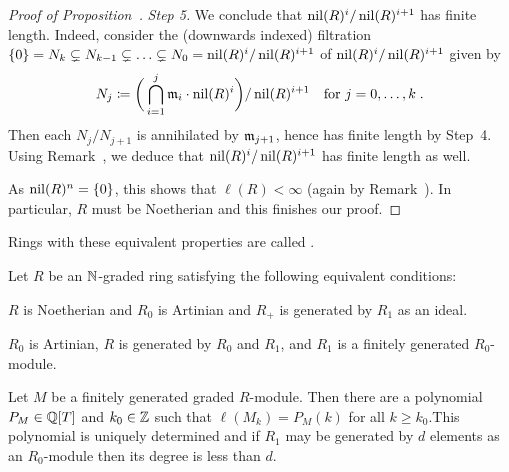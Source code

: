 \documentclass[a4paper,parskip=half,numbers=enddot, DIV=12]{scrreprt}
\begin{document}
\begin{proof}[Proof of Proposition~]
    \emph{Step 5.} We conclude that $\operatorname{nil}(R)^i/\operatorname{nil}(R)^{i+1}$ has finite length. Indeed, consider the (downwards indexed) filtration $\{0\}=N_k\subsetneq N_{k-1}\subsetneq \ldots\subsetneq N_0=\operatorname{nil}(R)^i/\operatorname{nil}(R)^{i+1}$ of $\operatorname{nil}(R)^i/\operatorname{nil}(R)^{i+1}$ given by
    \begin{align*}
        N_j\coloneqq\bigg(\bigcap_{i=1}^j\mathfrak{m}_i\cdot\operatorname{nil}(R)^i\bigg) /\operatorname{nil}(R)^{i+1}\quad\text{for }j=0,\ldots,k\;.
    \end{align*}
    Then each $N_j/N_{j+1}$  is annihilated by $\mathfrak{m}_{j+1}$, hence has finite length by Step~4.  Using Remark~, we deduce that $\operatorname{nil}(R)^i/\operatorname{nil}(R)^{i+1}$ has finite length as well.
    
    As $\operatorname{nil}(R)^n=\{0\}$, this shows that $\ell(R) <\infty$ (again by Remark~). In particular, $R$ must be Noetherian and this finishes our proof.
\end{proof}

\begin{defi}[Artinian]
    Rings with these equivalent properties are called .
\end{defi}
\begin{thm}
    Let $R$ be an $\mathbb{N}$-graded ring satisfying the following equivalent conditions:
    \begin{alphanumerate}
    \item 
        $R$ is Noetherian and $R_0$ is Artinian and $R_+$ is generated by $R_1$ as an ideal.
    \item 
        $R_0$ is Artinian, $R$ is generated by $R_0$ and $R_1$, and $R_1$ is a finitely generated $R_0$-module.
    \end{alphanumerate}
    Let $M$ be a finitely generated graded $R$-module. Then there are a polynomial $P_M\in \mathbb{Q}[T]$ and $k_0\in\mathbb{Z}$ such that $\ell(M_k) = P_M(k)$ for all $k\geq k_0$.This polynomial is uniquely determined and if $R_1$ may be generated by $d$ elements as an $R_0$-module then its degree is less than $d$.
\end{thm}
\end{document}
